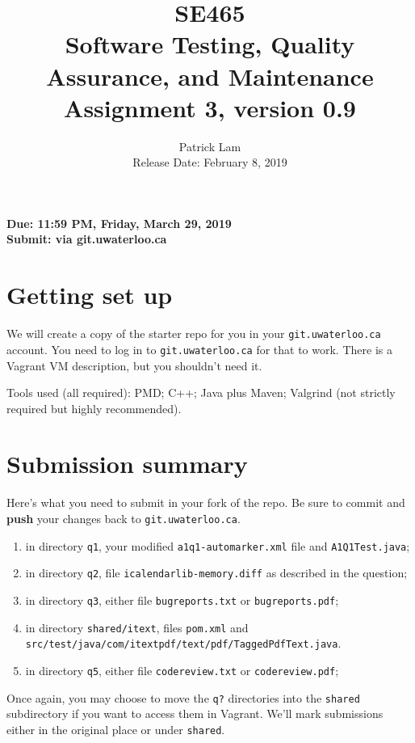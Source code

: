 \documentclass[10pt,hidelinks]{article}
\begin{document}
\title{
SE465 \\
Software Testing, Quality Assurance, and Maintenance\\
Assignment 3, version 0.9}
\author{Patrick Lam \\
{Release Date: February 8, 2019} \\
}
\renewcommand{\today}{}
\maketitle

\begin{center}

{\bf Due:  11:59 PM, Friday, March 29, 2019} \\
{\bf Submit: via git.uwaterloo.ca }\\
\end{center}

\section*{Getting set up}
We will create a copy of the starter repo for you in your {\tt git.uwaterloo.ca} account. You need to log in to {\tt git.uwaterloo.ca} for that to work. There is a Vagrant VM description,
but you shouldn't need it.

Tools used (all required): PMD; C++; Java plus Maven; Valgrind (not
strictly required but highly recommended).

\section*{Submission summary}
Here's what you need to submit in your fork of the repo. Be sure to commit
and {\bf push} your changes back to {\tt git.uwaterloo.ca}.
\begin{enumerate}
\item in directory {\tt q1}, your modified {\tt a1q1-automarker.xml} file and {\tt A1Q1Test.java};
\item in directory {\tt q2}, file {\tt icalendarlib-memory.diff} as described in the question;
\item in directory {\tt q3}, either file {\tt bugreports.txt} or {\tt bugreports.pdf};
\item in directory {\tt shared/itext}, files {\tt pom.xml} and {\tt src/test/java/com/itextpdf/text/pdf/TaggedPdfText.java}.
\item in directory {\tt q5}, either file {\tt codereview.txt} or {\tt codereview.pdf};
\end{enumerate}
Once again, you may choose to move the {\tt q?} directories into the {\tt shared} subdirectory if you want to access them in Vagrant. We'll mark submissions either in the original place or under {\tt shared}.
\end{document}
